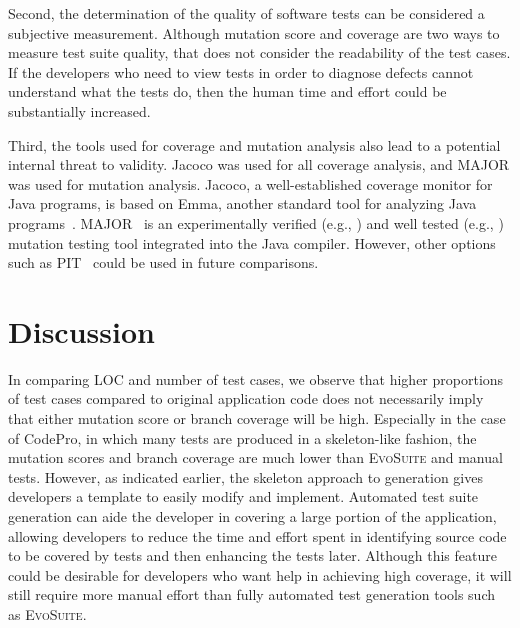 Second, the determination of the quality of software tests can be considered a subjective measurement. Although mutation score and coverage are two ways to measure test suite quality, that does not consider the readability of the test cases.  If the developers who need to view tests in order to diagnose defects cannot understand what the tests do, then the human time and effort could be substantially increased.

Third, the tools used for coverage and mutation analysis also lead to a potential internal threat to validity.  Jacoco was used for all coverage analysis, and MAJOR was used for mutation analysis.  Jacoco, a well-established coverage monitor for Java programs, is based on Emma, another standard tool for analyzing Java programs~\cite{jacoco}.  MAJOR~\cite{just2011} is an experimentally verified (e.g., \cite{just2014}) and well tested (e.g., \cite{just2011b}) mutation testing tool integrated into the Java compiler. However, other options such as PIT~\cite{ pit2014} could be used in future comparisons. 



\section{Discussion}
\label{sec:discussion}

In comparing LOC and number of test cases, we observe that higher proportions of test cases compared to original application code does not necessarily imply that either mutation score or branch coverage will be high.  Especially in the case of CodePro, in which many tests are produced in a skeleton-like fashion, the mutation scores and branch coverage are much lower than  \textsc{EvoSuite} and manual tests. However, as indicated earlier, the skeleton approach to generation gives developers a template to easily modify and implement. Automated test suite generation can aide the developer in covering a large portion of the application, allowing developers to reduce the time and effort spent in identifying source code to be covered by tests and then enhancing the tests later.  Although this feature could be desirable for developers who want help in achieving high coverage, it will still require more manual effort than fully automated test generation tools such as \textsc{EvoSuite}.

